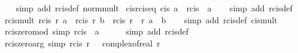 \begin{isabellebody}
%
\isadelimproof
\ \ %
\endisadelimproof
%
\isatagproof
{}\isamarkupfalse%
\ {\isacharparenleft}{\kern0pt}simp\ add{\isacharcolon}{\kern0pt}\ rcis{\isacharunderscore}{\kern0pt}def\ norm{\isacharunderscore}{\kern0pt}mult{\isacharparenright}{\kern0pt}%
\endisatagproof
{\isafoldproof}%
%
\isadelimproof
\isanewline
%
\endisadelimproof
\isanewline
{}\isamarkupfalse%
\ cis{\isacharunderscore}{\kern0pt}rcis{\isacharunderscore}{\kern0pt}eq{\isacharcolon}{\kern0pt}\ {\isachardoublequoteopen}cis\ a\ {\isacharequal}{\kern0pt}\ rcis\ {}\ a{\isachardoublequoteclose}\isanewline
%
\isadelimproof
\ \ %
\endisadelimproof
%
\isatagproof
{}\isamarkupfalse%
\ {\isacharparenleft}{\kern0pt}simp\ add{\isacharcolon}{\kern0pt}\ rcis{\isacharunderscore}{\kern0pt}def{\isacharparenright}{\kern0pt}%
\endisatagproof
{\isafoldproof}%
%
\isadelimproof
\isanewline
%
\endisadelimproof
\isanewline
{}\isamarkupfalse%
\ rcis{\isacharunderscore}{\kern0pt}mult{\isacharcolon}{\kern0pt}\ {\isachardoublequoteopen}rcis\ r{}\ a\ {\isacharasterisk}{\kern0pt}\ rcis\ r{}\ b\ {\isacharequal}{\kern0pt}\ rcis\ {\isacharparenleft}{\kern0pt}r{}\ {\isacharasterisk}{\kern0pt}\ r{}{\isacharparenright}{\kern0pt}\ {\isacharparenleft}{\kern0pt}a\ {\isacharplus}{\kern0pt}\ b{\isacharparenright}{\kern0pt}{\isachardoublequoteclose}\isanewline
%
\isadelimproof
\ \ %
\endisadelimproof
%
\isatagproof
{}\isamarkupfalse%
\ {\isacharparenleft}{\kern0pt}simp\ add{\isacharcolon}{\kern0pt}\ rcis{\isacharunderscore}{\kern0pt}def\ cis{\isacharunderscore}{\kern0pt}mult{\isacharparenright}{\kern0pt}%
\endisatagproof
{\isafoldproof}%
%
\isadelimproof
\isanewline
%
\endisadelimproof
\isanewline
{}\isamarkupfalse%
\ rcis{\isacharunderscore}{\kern0pt}zero{\isacharunderscore}{\kern0pt}mod\ {\isacharbrackleft}{\kern0pt}simp{\isacharbrackright}{\kern0pt}{\isacharcolon}{\kern0pt}\ {\isachardoublequoteopen}rcis\ {}\ a\ {\isacharequal}{\kern0pt}\ {}{\isachardoublequoteclose}\isanewline
%
\isadelimproof
\ \ %
\endisadelimproof
%
\isatagproof
{}\isamarkupfalse%
\ {\isacharparenleft}{\kern0pt}simp\ add{\isacharcolon}{\kern0pt}\ rcis{\isacharunderscore}{\kern0pt}def{\isacharparenright}{\kern0pt}%
\endisatagproof
{\isafoldproof}%
%
\isadelimproof
\isanewline
%
\endisadelimproof
\isanewline
{}\isamarkupfalse%
\ rcis{\isacharunderscore}{\kern0pt}zero{\isacharunderscore}{\kern0pt}arg\ {\isacharbrackleft}{\kern0pt}simp{\isacharbrackright}{\kern0pt}{\isacharcolon}{\kern0pt}\ {\isachardoublequoteopen}rcis\ r\ {}\ {\isacharequal}{\kern0pt}\ complex{\isacharunderscore}{\kern0pt}of{\isacharunderscore}{\kern0pt}real\ r{\isachardoublequoteclose}\isanewline

\end{isabellebody}
